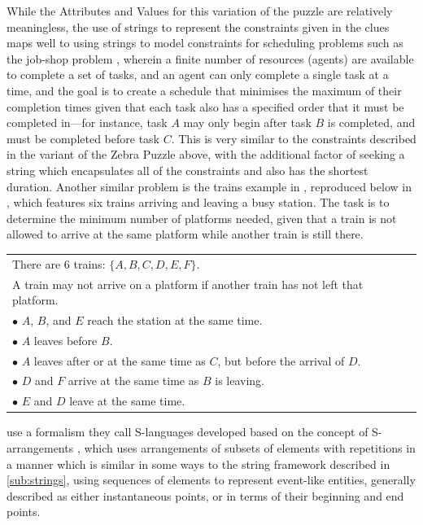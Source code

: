 \documentclass[a4paper,12pt,leqno,twoside]{article}
\begin{document}
While the Attributes and Values for this variation of the puzzle are relatively meaningless, the use of strings to represent the constraints given in the clues maps well to using strings to model constraints for scheduling problems such as the job-shop problem \citep{manne1960job,applegate1991computational}, wherein a finite number of resources (agents) are available to complete a set of tasks, and an agent can only complete a single task at a time, and the goal is to create a schedule that minimises the maximum of their completion times given that each task also has a specified order that it must be completed in---for instance, task $A$ may only begin after task $B$ is completed, and must be completed before task $C$. This is very similar to the constraints described in the variant of the Zebra Puzzle above, with the additional factor of seeking a string which encapsulates all of the constraints and also has the shortest duration. Another similar problem is the trains example in \citet{durand2008tool}, reproduced below in , which features six trains arriving and leaving a busy station. The task is to determine the minimum number of platforms needed, given that a train is not allowed to arrive at the same platform while another train is still there.
\begin{center}
	\begin{tabular}[h!]{|l|}
		\hline
		There are 6 trains: $\{A,B,C,D,E,F\}$.\\
		A train may not arrive on a platform if another train has not left that platform.\\
		$\bullet$ $A$, $B$, and $E$ reach the station at the same time.\\
		$\bullet$ $A$ leaves before $B$.\\
		$\bullet$ $A$ leaves after or at the same time as $C$, but before the arrival of $D$.\\
		$\bullet$ $D$ and $F$ arrive at the same time as $B$ is leaving.\\
		$\bullet$ $E$ and $D$ leave at the same time.\\
		\hline
	\end{tabular}
	\label{tab:train-problem-clues}
\end{center}
\citet[p. 3298]{durand2008tool} use a formalism they call S-languages developed based on the concept of S-arrangements \citep{schwer2002s}, which uses arrangements of subsets of elements with repetitions in a manner which is similar in some ways to the string framework described in \cref{sub:strings}, using sequences of elements to represent event-like entities, generally described as either instantaneous points, or in terms of their beginning and end points.
\end{document}
